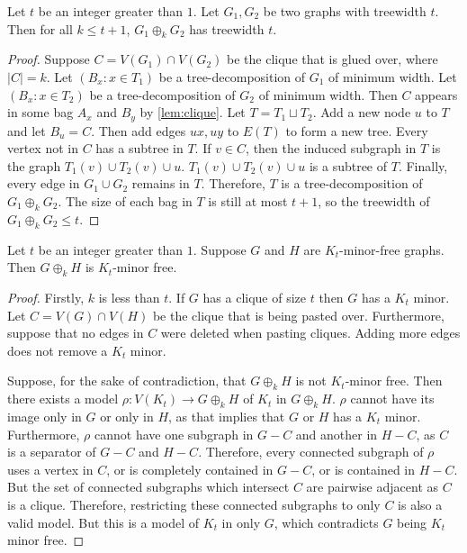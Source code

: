 \begin{proposition}
	Let $t$ be an integer greater than $ 1$. Let $G_1, G_2$ be two graphs with treewidth $t$. Then for all $k \leq t + 1$, $G_1 \oplus_k G_2$ has treewidth $t$. 
\end{proposition}
\begin{proof}
	Suppose $C = V(G_1) \cap V(G_2)$ be the clique that is glued over, where $|C| = k$. Let $(B_x: x \in T_1)$ be a tree-decomposition of $G_1$ of minimum width. Let $(B_x : x \in T_2)$ be a tree-decomposition of $G_2$ of minimum width. Then $C$ appears in some bag $A_x$ and $B_y$ by \cref{lem:clique}. Let $T = T_1 \sqcup T_2$. Add a new node $u$ to $T$ and let $B_u = C$. Then add edges $ux, uy$ to $E(T)$ to form a new tree. Every vertex not in $C$ has a subtree in $T$. If $v \in C$, then the induced subgraph in $T$ is the graph $T_1(v) \cup T_2(v) \cup u$. $T_1(v) \cup T_2(v) \cup u$ is a subtree of $T$. Finally, every edge in $G_1 \cup G_2$ remains in $T$. Therefore, $T$ is a tree-decomposition of $G_1 \oplus_k G_2$. The size of each bag in $T$ is still at most $t + 1$, so the treewidth of $G_1 \oplus_k G_2 \leq t$.
\end{proof}

\begin{proposition}
	Let $t$ be an integer greater than $1$. Suppose $G$ and $H$ are $K_t$-minor-free graphs. Then $G \oplus_k H$ is $K_{t}$-minor free. 
\end{proposition}
\begin{proof}
	Firstly, $k$ is less than $t$. If $G$ has a clique of size $t$ then $G$ has a $K_t$ minor. Let $C = V(G) \cap V(H)$ be the clique that is being pasted over. Furthermore, suppose that no edges in $C$ were deleted when pasting cliques. Adding more edges does not remove a $K_t$ minor. 

	Suppose, for the sake of contradiction, that $G \oplus_k H$ is not $K_t$-minor free. Then there exists a model $\rho: V(K_t) \rightarrow G\oplus_k H$ of $K_t$ in $G \oplus_k H$. $\rho$ cannot have its image only in $G$ or only in $H$, as that implies that $G$ or $H$ has a $K_t$ minor. Furthermore, $\rho$ cannot have one subgraph in $G - C$ and another in $H - C$, as $C$ is a separator of $G - C$ and $H - C$.
	Therefore, every connected subgraph of $\rho$ uses a vertex in $C$, or is completely contained in $G - C$, or is contained in $H - C$. But the set of connected subgraphs which intersect $C$ are pairwise adjacent as $C$ is a clique. Therefore, restricting these connected subgraphs to only $C$ is also a valid model. But this is a model of $K_t$ in only $G$, which contradicts $G$ being $K_t$ minor free. 
\end{proof}

